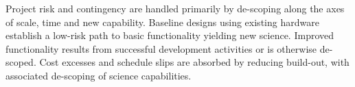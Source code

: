 \documentclass[preprint]{aastex}
\begin{document}
Project risk and contingency are handled primarily by de-scoping along the axes of scale, time and new capability.  Baseline designs using
existing hardware establish a low-risk path to basic functionality yielding new science.  Improved functionality
results from successful development activities or is otherwise de-scoped.
Cost excesses and schedule slips are absorbed by reducing
build-out, with associated de-scoping of science capabilities.


\clearpage
\setcounter{page}{1}
\thispagestyle{empty}
%
%
%


\end{document}
